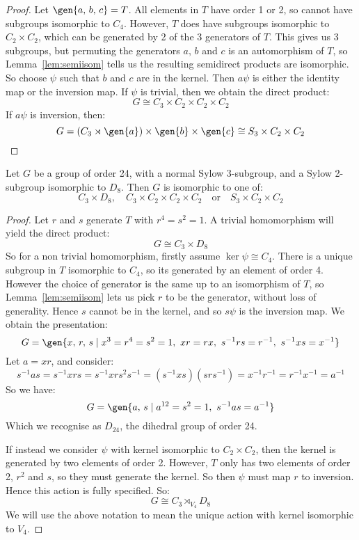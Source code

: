 \begin{proof}
    Let \(\gen{a,\,b,\,c} = T\).
    All elements in \(T\) have order 1 or 2, so cannot have subgroups isomorphic to \(C_4\).
    However, \(T\) does have subgroups isomorphic to \(C_2 \times C_2\), which can be generated by 2 of the 3
    generators of \(T\).
    This gives us 3 subgroups, but permuting the generators \(a,\,b\) and \(c\) is an automorphism of \(T\), so
    Lemma~\ref{lem:semiisom} tells us the resulting semidirect products are isomorphic.
    So choose \(\psi\) such that \(b\) and \(c\) are in the kernel.
    Then \(a\psi\) is either the identity map or the inversion map.
    If \(\psi\) is trivial, then we obtain the direct product:
    \[G \cong C_3 \times C_2 \times C_2 \times C_2\]
    If \(a\psi\) is inversion, then:
    \[G = (C_3 \rtimes \gen{a}) \times \gen{b} \times \gen{c} \cong S_3 \times C_2 \times C_2\]
\end{proof}

\begin{lemma}
    Let \(G\) be a group of order 24, with a normal Sylow 3-subgroup, and a Sylow 2-subgroup isomorphic to \(D_8\).
    Then \(G\) is isomorphic to one of:
    \[
        C_3 \times D_8, \quad%
        C_3 \times C_2 \times C_2 \times C_2 \quad \text{or} \quad%
        S_3 \times C_2 \times C_2
    \]
\end{lemma}

\begin{proof}
    Let \(r\) and \(s\) generate \(T\) with \(r^4 = s^2 = 1\).
    A trivial homomorphism will yield the direct product:
    \[G \cong C_3 \times D_8\]
    So for a non trivial homomorphism, firstly assume \(\ker\psi \cong C_4\).
    There is a unique subgroup in \(T\) isomorphic to \(C_4\), so its generated by an element of order 4.
    However the choice of generator is the same up to an isomorphism of \(T\), so Lemma~\ref{lem:semiisom} lets us
    pick \(r\) to be the generator, without loss of generality.
    Hence \(s\) cannot be in the kernel, and so \(s\psi\) is the inversion map.
    We obtain the presentation:
    \[G = \gen{x,\,r,\,s \mid x^3 = r^4 = s^2 = 1,\ xr = rx,\ s^{-1}rs = r^{-1},\ s^{-1}xs = x^{-1}}\]
    Let \(a = xr\), and consider:
    \[s^{-1}as = s^{-1}xrs = s^{-1}xrs^2 s^{-1} = (s^{-1}xs)(srs^{-1}) = x^{-1}r^{-1} = r^{-1}x^{-1} = a^{-1}\]
    So we have:
    \[G = \gen{a,\,s \mid a^{12} = s^2 = 1,\ s^{-1}as = a^{-1}}\]
    Which we recognise as \(D_{24}\), the dihedral group of order 24.

    If instead we consider \(\psi\) with kernel isomorphic to \(C_2 \times C_2\), then the kernel is generated by
    two elements of order 2.
    However, \(T\) only has two elements of order 2, \(r^2\) and \(s\), so they must generate the kernel.
    So then \(\psi\) must map \(r\) to inversion.
    Hence this action is fully specified.
    So:
    \[G \cong C_3 \rtimes_{V_4} D_8\]
    We will use the above notation to mean the unique action with kernel isomorphic to \(V_4\).
\end{proof}

